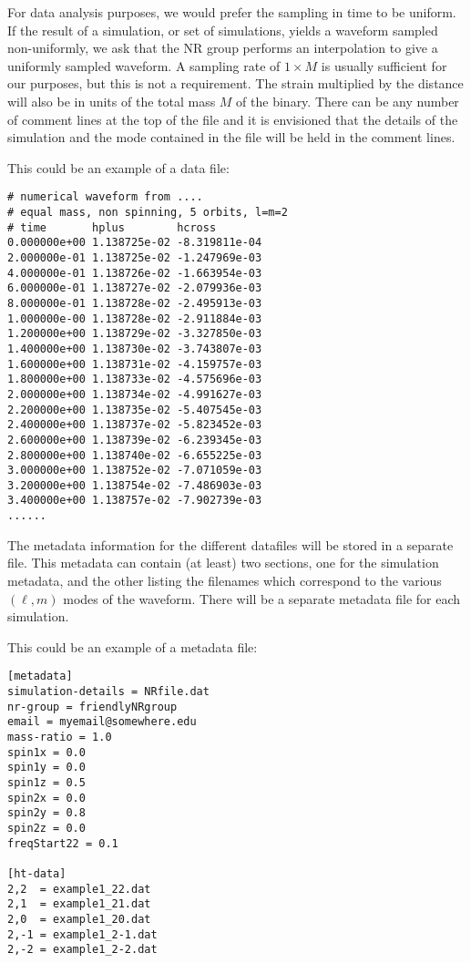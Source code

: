 \documentclass[prd,preprintnumbers,superscriptaddress,eqsecnum]{revtex4}
\numberwithin{equation}{section}
\begin{document}
For data analysis purposes, we would prefer the sampling in time to be
uniform. If the result of a simulation, or set of simulations, yields a
waveform sampled non-uniformly, we ask that the NR group performs an
interpolation to give a uniformly sampled waveform. A sampling rate
of $1\times M$ is usually sufficient for our purposes, but this is not
a requirement. The strain multiplied by the distance will also be in
units of the total mass $M$ of the binary. There can be any number of
comment lines at the top of the file and it is envisioned that the
details of the simulation and the mode contained in the file will be
held in the comment lines.

This could be an example of a data file:

\begin{verbatim}
# numerical waveform from ....
# equal mass, non spinning, 5 orbits, l=m=2
# time       hplus        hcross
0.000000e+00 1.138725e-02 -8.319811e-04
2.000000e-01 1.138725e-02 -1.247969e-03
4.000000e-01 1.138726e-02 -1.663954e-03
6.000000e-01 1.138727e-02 -2.079936e-03
8.000000e-01 1.138728e-02 -2.495913e-03
1.000000e-00 1.138728e-02 -2.911884e-03
1.200000e+00 1.138729e-02 -3.327850e-03
1.400000e+00 1.138730e-02 -3.743807e-03
1.600000e+00 1.138731e-02 -4.159757e-03
1.800000e+00 1.138733e-02 -4.575696e-03
2.000000e+00 1.138734e-02 -4.991627e-03
2.200000e+00 1.138735e-02 -5.407545e-03
2.400000e+00 1.138737e-02 -5.823452e-03
2.600000e+00 1.138739e-02 -6.239345e-03
2.800000e+00 1.138740e-02 -6.655225e-03
3.000000e+00 1.138752e-02 -7.071059e-03
3.200000e+00 1.138754e-02 -7.486903e-03
3.400000e+00 1.138757e-02 -7.902739e-03
......
\end{verbatim}

The metadata information for the different datafiles will be stored in a
separate file. This metadata can contain (at least) two sections,
one for the simulation metadata, and the other listing the filenames
which correspond to the various $(\ell,m)$ modes of the waveform. There
will be a separate metadata file for each simulation.

This could be an example of a metadata file:

\begin{verbatim}
[metadata]
simulation-details = NRfile.dat
nr-group = friendlyNRgroup
email = myemail@somewhere.edu
mass-ratio = 1.0
spin1x = 0.0
spin1y = 0.0
spin1z = 0.5
spin2x = 0.0
spin2y = 0.8
spin2z = 0.0
freqStart22 = 0.1

[ht-data]
2,2  = example1_22.dat
2,1  = example1_21.dat
2,0  = example1_20.dat
2,-1 = example1_2-1.dat
2,-2 = example1_2-2.dat
\end{verbatim}
\end{document}
